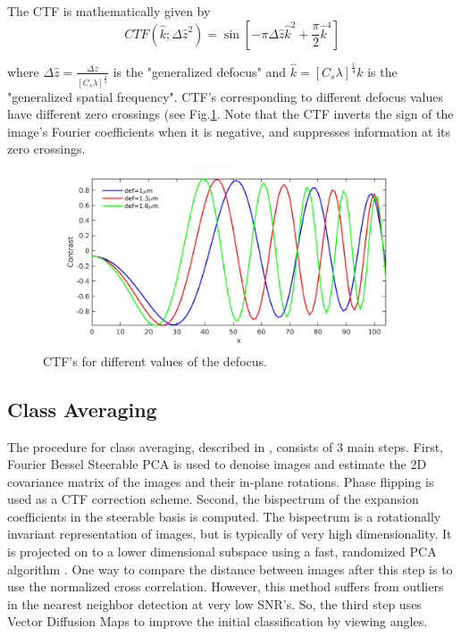 \documentclass{article}
\begin{document}
The CTF is mathematically given by \cite{frankctf}
\begin{equation}
CTF(\hat{k};\Delta\hat{z}^2)= \sin[-\pi \Delta\hat{z}\hat{k}^2 + \frac{\pi}{2} \hat{k}^4]
\label{eq:ctf}
\end{equation}

where 
$\Delta\hat{z}=\frac{\Delta z}{[C_s \lambda]^{\frac{1}{2}}}$ is the "generalized defocus" and $\hat{k}=[C_s \lambda]^{\frac{1}{4}}k$ is the "generalized spatial frequency". CTF's corresponding to different defocus values have different zero crossings (see Fig.\ref{fig:ctf}. Note that the CTF inverts the sign of the image's Fourier coefficients when it is negative, and suppresses information at its zero crossings.

\begin{figure}
\begin{center}
\includegraphics[scale=0.4]{ctfeg_fig.png}
\caption{CTF's for different values of the defocus.}\label{fig:ctf}
\end{center}

\end{figure}


\subsection{Class Averaging}
The procedure for class averaging, described in \cite{zhao}, consists of 3 main steps. First, Fourier Bessel Steerable PCA is used to denoise images and estimate the 2D covariance matrix of the images and their in-plane rotations. Phase flipping is used as a CTF correction scheme. Second, the bispectrum of the expansion coefficients in the steerable basis is computed. The bispectrum is a rotationally invariant representation of images, but is typically of very high dimensionality. It is projected on to a lower dimensional subspace using a fast, randomized PCA algorithm \cite{rokhlin}. One way to compare the distance between images after this step is to use the normalized cross correlation. However, this method suffers from outliers in the nearest neighbor detection at very low SNR's. So, the third step uses Vector Diffusion Maps to improve the initial classification by viewing angles.
\end{document}
